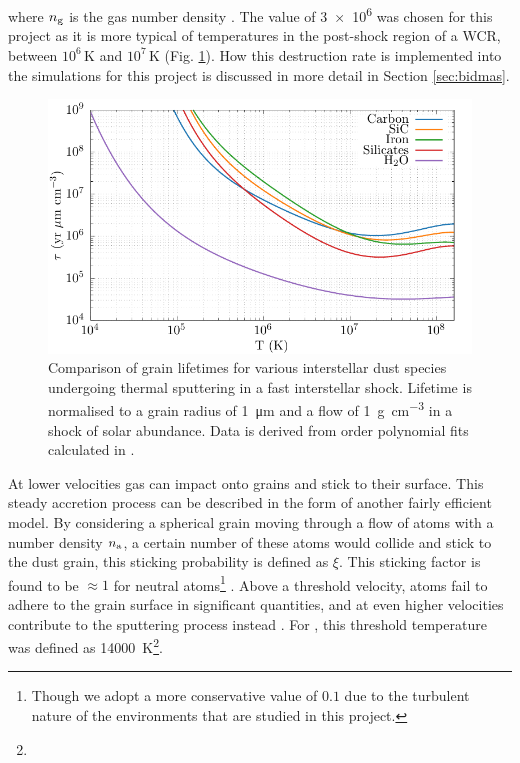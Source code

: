 \noindent
where $n_\text{g}$ is the gas number density \parencite{drainePhysicsDustGrains1979,dwekCoolingSputteringInfrared1996}.
The value of \SI{3e6}{\year} was chosen for this project as it is more typical of temperatures in the post-shock region of a WCR, between $10^6\,\si{\kelvin}$ and $10^7\,\si{\kelvin}$ (Fig. \ref{fig:grain-lifespan}).
How this destruction rate is implemented into the simulations for this project is discussed in more detail in Section \ref{sec:bidmas}.

\begin{figure}[h]
  \centering
  \includegraphics{assets/tielens-sputtering/sputter.pdf}
  \caption[Grain lifetime comparison]{Comparison of grain lifetimes for various interstellar dust species undergoing thermal sputtering in a fast interstellar shock. Lifetime is normalised to a grain radius of \SI{1}{\micro\metre} and a flow of \SI{1}{\gram\per\centi\metre\cubed} in a shock of solar abundance. Data is derived from  order polynomial fits calculated in \textcite[Table~4]{tielens_physics_1994}.}
  \label{fig:grain-lifespan}
\end{figure}

At lower velocities gas can impact onto grains and stick to their surface.
This steady accretion process can be described in the form of another fairly efficient model.
By considering a spherical grain moving through a flow of atoms with a number density $n_\text{a}$, a certain number of these atoms would collide and stick to the dust grain, this sticking probability is defined as $\xi$.
This sticking factor is found to be $\approx 1$ for neutral atoms\footnote{Though we adopt a more conservative value of $0.1$ due to the turbulent nature of the environments that are studied in this project.} \parencite{watsonAbundancesInterstellarMolecules1972}.
Above a threshold velocity, atoms fail to adhere to the grain surface in significant quantities, and at even higher velocities contribute to the sputtering process instead \parencite{spitzerPhysicalProcessesInterstellar2008}.
For , this threshold temperature was defined as \SI{14000}{\kelvin}\footnote{}.

